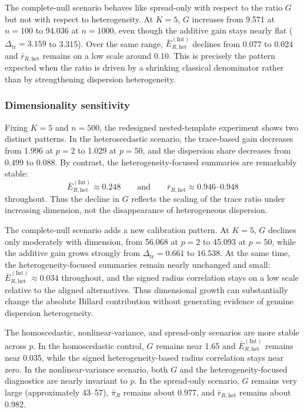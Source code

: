 \documentclass[preprint, times, 12pt, authoryear]{elsarticle}
\begin{document}
The complete-null scenario behaves like spread-only with respect to the ratio $G$ but not with respect to heterogeneity. At $K=5$, $G$ increases from 9.571 at $n=100$ to 94.036 at $n=1000$, even though the additive gain stays nearly flat ($\Delta_{\mathrm{tr}}=3.159$ to 3.315). Over the same range, $\bar E_{R,\mathrm{het}}^{(\mathrm{Int})}$ declines from 0.077 to 0.024 and $\bar r_{R,\mathrm{het}}$ remains on a low scale around 0.10. This is precisely the pattern expected when the ratio is driven by a shrinking classical denominator rather than by strengthening dispersion heterogeneity.

\subsubsection{Dimensionality sensitivity}

Fixing $K=5$ and $n=500$, the redesigned nested-template experiment shows two distinct patterns. In the heteroscedastic scenario, the trace-based gain decreases from 1.996 at $p=2$ to 1.029 at $p=50$, and the dispersion share decreases from 0.499 to 0.088. By contrast, the heterogeneity-focused summaries are remarkably stable:
\[
\bar E_{R,\mathrm{het}}^{(\mathrm{Int})}\approx 0.248
\qquad\text{and}\qquad
\bar r_{R,\mathrm{het}}\approx 0.946\text{--}0.948
\]
throughout. Thus the decline in $G$ reflects the scaling of the trace ratio under increasing dimension, not the disappearance of heterogeneous dispersion.

The complete-null scenario adds a new calibration pattern. At $K=5$, $G$ declines only moderately with dimension, from 56.068 at $p=2$ to 45.093 at $p=50$, while the additive gain grows strongly from $\Delta_{\mathrm{tr}}=0.661$ to $16.538$. At the same time, the heterogeneity-focused summaries remain nearly unchanged and small: $\bar E_{R,\mathrm{het}}^{(\mathrm{Int})}\approx 0.034$ throughout, and the signed radius correlation stays on a low scale relative to the aligned alternatives. Thus dimensional growth can substantially change the absolute Billard contribution without generating evidence of genuine dispersion heterogeneity.

The homoscedastic, nonlinear-variance, and spread-only scenarios are more stable across $p$. In the homoscedastic control, $G$ remains near 1.65 and $\bar E_{R,\mathrm{het}}^{(\mathrm{Int})}$ remains near 0.035, while the signed heterogeneity-based radius correlation stays near zero. In the nonlinear-variance scenario, both $G$ and the heterogeneity-focused diagnostics are nearly invariant to $p$. In the spread-only scenario, $G$ remains very large (approximately 43--57), $\bar\pi_R$ remains about 0.977, and $\bar r_{R,\mathrm{het}}$ remains about 0.982.
\end{document}
